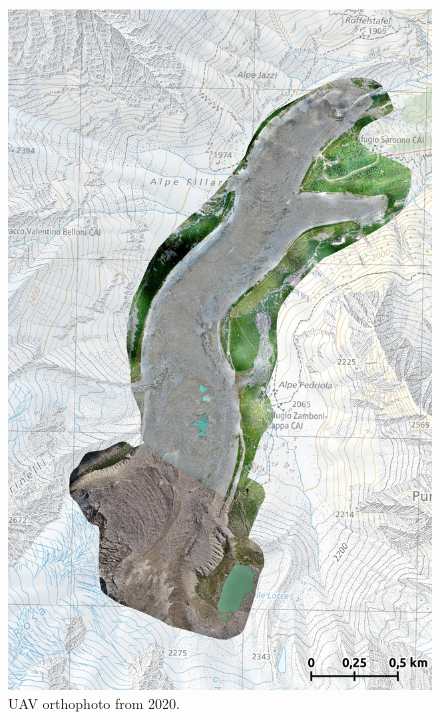 \begin{figure}[p]
    \centering
    \includegraphics[height=\textheight]{figures/appendix/orto_2020.jpg}
    \caption[]{UAV orthophoto from 2020.}
\end{figure}

